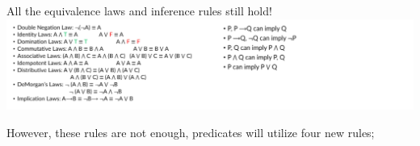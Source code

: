 \documentclass[12pt, letterpaper]{article}
\begin{document}
\pagebreak
All the equivalence laws and inference rules still hold! \\

\includegraphics[width=\textwidth]{images/compiled rules.png}

However, these rules are not enough, predicates will utilize four new rules;

\end{document}
